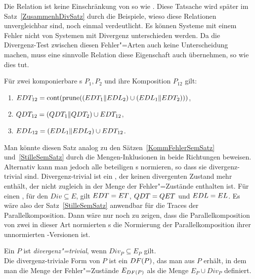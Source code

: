 Die Relation \DRel{} ist keine Einschränkung von \ERel{} so wie \QRel{}. Diese
Tatsache wird später im Satz~\ref{ZusammenhDivSatz} durch die Beispiele, wieso
diese Relationen unvergleichbar sind, noch einmal verdeutlicht. Es können
Systeme mit einem Fehler nicht von Systemen mit Divergenz unterschieden werden.
Da die Divergenz-Test zwischen diesen \glqq Fehler"=Arten\grqq{} auch keine
Unterscheidung machen, muss eine sinnvolle Relation diese Eigenschaft auch
übernehmen, so wie \DRel{} dies tut.

\begin{Satz}
  \label{DivSemSatz}
  Für zwei komponierbare \MEIO{}s $P_1,P_2$ und ihre Komposition $P_{12}$ gilt:
  \begin{enumerate}
    \item $EDT _{12} =\mathrm{cont} (\mathrm{prune} ((EDT _1\|EDL _2)\cup (EDL _1\|EDT
      _2)))$,
    \item $QDT _{12} =(QDT _1\|QDT _2)\cup EDT _{12}$,
    \item $EDL _{12} =(EDL _1\|EDL _2)\cup EDT _{12}$.
  \end{enumerate}
\end{Satz}

Man könnte diesen Satz analog zu den Sätzen~\ref{KommFehlerSemSatz}
und~\ref{StilleSemSatz} durch die Mengen-Inklusionen in beide Richtungen
beweisen. Alternativ kann man jedoch alle beteiligen \MEIO{}s normieren, so
dass sie divergenz-trivial sind. Divergenz-trivial ist ein \MEIO{}, der keinen
divergenten Zustand mehr enthält, der nicht zugleich in der Menge der
Fehler"=Zustände enthalten ist. Für einen \MEIO{}, für den $Div\subseteq E$,
gilt $EDT = ET$, $QDT = QET$ und $EDL = EL$. Es wäre also der
Satz~\ref{StilleSemSatz} anwendbar für die Traces der Parallelkomposition. Dann
wäre nur noch zu zeigen, dass die Parallelkomposition von zwei in dieser Art
normierten \MEIO{}s die Normierung der Parallelkomposition ihrer unnormierten
\MEIO{}-Versionen ist.

\begin{Def}
  \label{DivNormDef}
  Ein \MEIO{} $P$ ist \emph{divergenz"=trivial}, wenn $Div _P \subseteq E_P$
  gilt.\\
  Die divergenz-triviale Form von $P$ ist ein \MEIO{} $DF (P)$, das man aus
  $P$ erhält, in dem man die Menge der Fehler"=Zustände $E_{DF (P)}$ als die
  Menge $E_P \cup Div _P$ definiert.
\end{Def}

